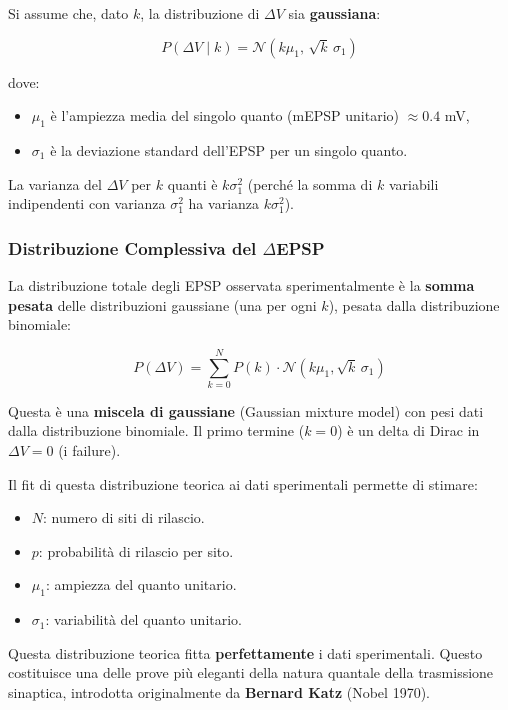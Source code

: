 Si assume che, dato $k$, la distribuzione di $\Delta V$ sia \textbf{gaussiana}:

\begin{equation}
P(\Delta V \mid k) = \mathcal{N}(k\mu_1, \, \sqrt{k}\,\sigma_1)
\end{equation}

dove:
\begin{itemize}
    \item $\mu_1$ è l'ampiezza media del singolo quanto (mEPSP unitario) $\approx 0.4$ mV,
    \item $\sigma_1$ è la deviazione standard dell'EPSP per un singolo quanto.
\end{itemize}

La varianza del $\Delta V$ per $k$ quanti è $k\sigma_1^2$ (perché la somma di $k$ variabili indipendenti con varianza $\sigma_1^2$ ha varianza $k\sigma_1^2$).

\subsubsection{Distribuzione Complessiva del $\Delta$EPSP}

La distribuzione totale degli EPSP osservata sperimentalmente è la \textbf{somma pesata} delle distribuzioni gaussiane (una per ogni $k$), pesata dalla distribuzione binomiale:

\begin{equation}
P(\Delta V) = \sum_{k=0}^{N} P(k) \cdot \mathcal{N}(k\mu_1, \sqrt{k}\,\sigma_1)
\end{equation}

Questa è una \textbf{miscela di gaussiane} (Gaussian mixture model) con pesi dati dalla distribuzione binomiale. Il primo termine ($k=0$) è un delta di Dirac in $\Delta V = 0$ (i failure).

Il fit di questa distribuzione teorica ai dati sperimentali permette di stimare:
\begin{itemize}
    \item $N$: numero di siti di rilascio.
    \item $p$: probabilità di rilascio per sito.
    \item $\mu_1$: ampiezza del quanto unitario.
    \item $\sigma_1$: variabilità del quanto unitario.
\end{itemize}

\begin{tcolorbox}[colback=gray!5, colframe=gray!40, arc=2mm, boxrule=0.5pt]
Questa distribuzione teorica fitta \textbf{perfettamente} i dati sperimentali. Questo costituisce una delle prove più eleganti della natura quantale della trasmissione sinaptica, introdotta originalmente da \textbf{Bernard Katz} (Nobel 1970).
\end{tcolorbox}


